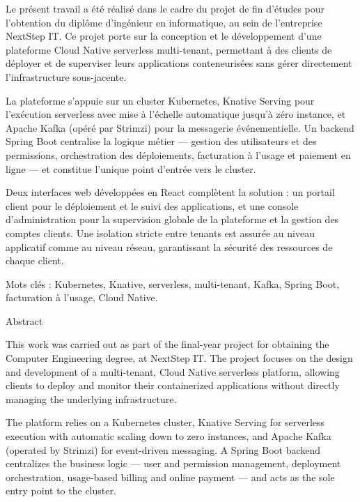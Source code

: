 
\begin{flushleft}
\normalsize

Le présent travail a été réalisé dans le cadre du projet de fin d’études pour l’obtention du diplôme d’ingénieur en informatique, au sein de l’entreprise NextStep IT. Ce projet porte sur la conception et le développement d’une plateforme Cloud Native serverless multi-tenant, permettant à des clients de déployer et de superviser leurs applications conteneurisées sans gérer directement l’infrastructure sous-jacente.

La plateforme s’appuie sur un cluster Kubernetes, Knative Serving pour l’exécution serverless avec mise à l’échelle automatique jusqu’à zéro instance, et Apache Kafka (opéré par Strimzi) pour la messagerie événementielle. Un backend Spring Boot centralise la logique métier — gestion des utilisateurs et des permissions, orchestration des déploiements, facturation à l’usage et paiement en ligne — et constitue l’unique point d’entrée vers le cluster.

Deux interfaces web développées en React complètent la solution : un portail client pour le déploiement et le suivi des applications, et une console d’administration pour la supervision globale de la plateforme et la gestion des comptes clients. Une isolation stricte entre tenants est assurée au niveau applicatif comme au niveau réseau, garantissant la sécurité des ressources de chaque client.

Mots clés : Kubernetes, Knative, serverless, multi-tenant, Kafka, Spring Boot, facturation à l’usage, Cloud Native.\\[1pt]

\medskip
\medskip
\medskip

\Huge{Abstract}
\normalsize

\medskip
\medskip
\medskip

This work was carried out as part of the final-year project for obtaining the Computer Engineering degree, at NextStep IT. The project focuses on the design and development of a multi-tenant, Cloud Native serverless platform, allowing clients to deploy and monitor their containerized applications without directly managing the underlying infrastructure.

The platform relies on a Kubernetes cluster, Knative Serving for serverless execution with automatic scaling down to zero instances, and Apache Kafka (operated by Strimzi) for event-driven messaging. A Spring Boot backend centralizes the business logic — user and permission management, deployment orchestration, usage-based billing and online payment — and acts as the sole entry point to the cluster.


\end{flushleft}
